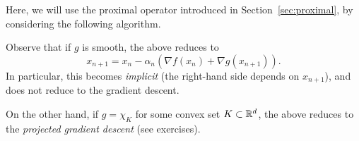  
     Here, we will use the proximal operator introduced in Section~\ref{sec:proximal}, by considering the following algorithm.
 
 
     \begin{remark}
         Observe that if $g$ is smooth, the above reduces to
         \begin{equation}
             x_{n+1} =  x_n - \alpha_n\left( \nabla f(x_n) + \nabla g(x_{n+1})\right).
         \end{equation}
         In particular, this becomes \emph{implicit} (the right-hand side depends on $x_{n+1}$), and does not reduce to the gradient descent.
 
         On the other hand, if $g=\chi_K$ for some convex set $K\subset \mathbb{R}^d$, the above reduces to the \emph{projected gradient descent} (see exercises).
     \end{remark}
 
